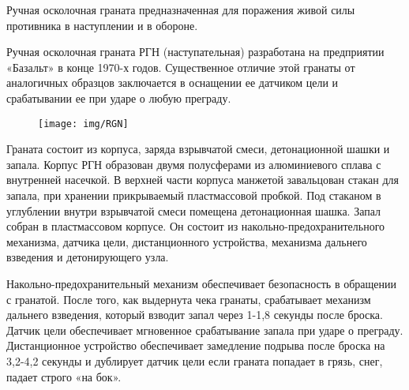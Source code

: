 \documentclass[12pt,a4paper]{report}
\begin{document}
Ручная осколочная граната  предназначенная для поражения живой силы противника в наступлении и в обороне.

Ручная осколочная граната РГН (наступательная) разработана на предприятии «Базальт» в конце 1970-х годов. Существенное отличие этой гранаты от аналогичных образцов заключается в оснащении ее датчиком цели и срабатывании ее при ударе о любую преграду.
\begin{figure}[h!]
\centering
\texttt{[image: img/RGN]}
\caption[Ручная наступательная гранната РГО]{}
\label{fig:RGN}
\end{figure}

Граната состоит из корпуса, заряда взрывчатой смеси, детонационной шашки и запала. Корпус РГН образован двумя полусферами из алюминиевого сплава с внутренней насечкой. В верхней части корпуса манжетой завальцован стакан для запала, при хранении прикрываемый пластмассовой пробкой. Под стаканом в углублении внутри взрывчатой смеси помещена детонационная шашка. Запал собран в пластмассовом корпусе. Он состоит из накольно-предохранительного механизма, датчика цели, дистанционного устройства, механизма дальнего взведения и детонирующего узла.

Накольно-предохранительный механизм обеспечивает безопасность в обращении с гранатой. После того, как выдернута чека гранаты, срабатывает механизм дальнего взведения, который взводит запал через 1-1,8 секунды после броска. Датчик цели обеспечивает мгновенное срабатывание запала при ударе о преграду. Дистанционное устройство обеспечивает замедление подрыва после броска на 3,2-4,2 секунды и дублирует датчик цели если граната попадает в грязь, снег, падает строго «на бок».
\end{document}
